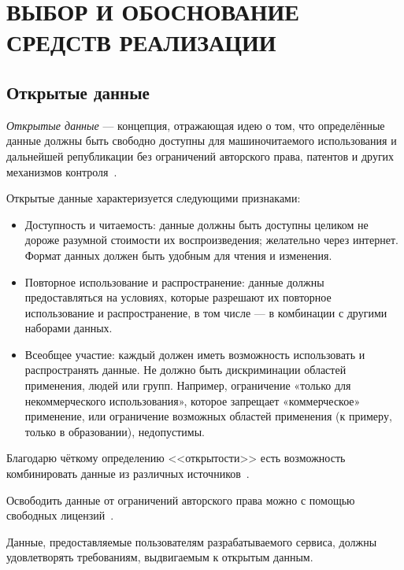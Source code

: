 \section[Выбор и обоснование средств реализации]{ВЫБОР И ОБОСНОВАНИЕ \\ СРЕДСТВ РЕАЛИЗАЦИИ}
\label{sec:choice}

\subsection{Открытые данные}
\label{ssec:choice_opendata}

\textit{Открытые данные} --- концепция, отражающая идею о том, что определённые данные
должны быть свободно доступны для машиночитаемого использования и дальнейшей републикации без
ограничений авторского права, патентов и других механизмов контроля~\cite{wiki_opendata}.

Открытые данные характеризуется следующими признаками:
\begin{itemize}

\item
Доступность и читаемость: данные должны быть доступны целиком не дороже
разумной стоимости их воспроизведения; желательно через интернет.
Формат данных должен быть удобным для чтения и изменения.

\item
Повторное использование и распространение: данные должны предоставляться на условиях,
которые разрешают их повторное использование и распространение,
в том числе --- в комбинации с другими наборами данных.

\item
Всеобщее участие: каждый должен иметь возможность использовать и распространять данные.
Не должно быть дискриминации областей применения, людей или групп.
Например, ограничение «только для некоммерческого использования»,
которое запрещает «коммерческое» применение, или ограничение возможных областей применения
(к примеру, только в образовании), недопустимы.

\end{itemize}

Благодарю чёткому определению <<открытости>> есть возможность комбинировать данные
из различных источников~\cite{opendatahandbook_open_data}.

Освободить данные от ограничений авторского права можно с помощью свободных
лицензий~\cite{wiki_opendata}.

Данные, предоставляемые пользователям разрабатываемого сервиса,
должны удовлетворять требованиям, выдвигаемым к открытым данным.

